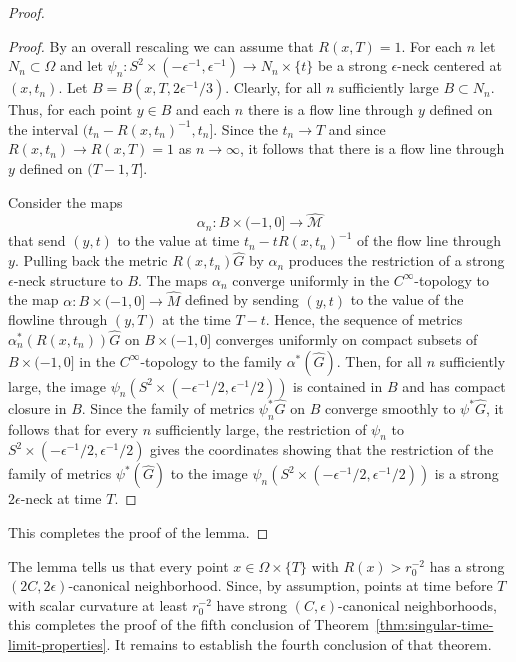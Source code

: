 \begin{proof}
\begin{proof}
By an overall rescaling we can assume that $R(x,T)=1$. For each $n$
let $N_n\subset \Omega$ and let $\psi_n\colon S^2\times
(-\epsilon^{-1},\epsilon^{-1})\to N_n\times\{t\}$ be a strong
$\epsilon$-neck centered at $(x,t_n)$. Let
$B=B(x,T,2\epsilon^{-1}/3)$. Clearly, for all $n$ sufficiently large
$B\subset N_n$. Thus, for each point $y\in B$ and each $n$ there is
a flow line through $y$ defined on the interval
$(t_n-R(x,t_n)^{-1},t_n]$. Since the $t_n\rightarrow T$ and since
$R(x,t_n)\rightarrow R(x,T)=1$ as $n\rightarrow \infty$, it follows
that there is a flow line through $y$ defined on $(T-1,T]$.

Consider the maps
$$\alpha_n\colon B\times (-1,0]\to \widehat{\mathcal M}$$
that send $(y,t)$ to the value at time $t_n-tR(x,t_n)^{-1}$ of the
flow line through $y$. Pulling back the metric $R(x,t_n)\widehat G$
by $\alpha_n$ produces the restriction of a strong $\epsilon$-neck
structure to $B$. The maps $\alpha_n$ converge uniformly in the
$C^\infty$-topology to the map $\alpha\colon B\times (-1,0]\to
\widehat M$ defined by sending $(y,t)$ to the value of the flowline
through $(y,T)$ at the time $T-t$. Hence, the sequence of metrics
$\alpha^*_n(R(x,t_n))\widehat G$ on $B\times (-1,0]$ converges
uniformly on compact subsets of $B\times (-1,0]$ in the
$C^\infty$-topology to the family $\alpha^*(\widehat G)$.  Then, for
all $n$ sufficiently large, the image $\psi_n(S^2\times
(-\epsilon^{-1}/2,\epsilon^{-1}/2))$ is contained in $B$ and has
compact closure in $B$. Since the family of  metrics
$\psi_n^*\widehat G$ on $B$ converge smoothly to $\psi^*\widehat G$,
it follows that
 for every $n$ sufficiently
large, the restriction of $\psi_n$ to $S^2\times
(-\epsilon^{-1}/2,\epsilon^{-1}/2)$ gives the coordinates showing
that the restriction of the family of metrics $\psi^*(\widehat G)$
to the image $\psi_n(S^2\times (-\epsilon^{-1}/2,\epsilon^{-1}/2))$
is a strong $2\epsilon$-neck at
time $T$.
\end{proof}





This completes the proof of the lemma.
\end{proof}

The lemma tells us that every point  $x\in\Omega\times\{T\}$ with
$R(x)>r_0^{-2}$ has a strong $(2C,2\epsilon)$-canonical
neighborhood. Since, by assumption, points at time before $T$ with
scalar curvature at least $r_0^{-2}$ have strong
$(C,\epsilon)$-canonical neighborhoods, this completes the proof of
the fifth conclusion of Theorem~\ref{thm:singular-time-limit-properties}. It remains to establish
the fourth conclusion of that theorem.

